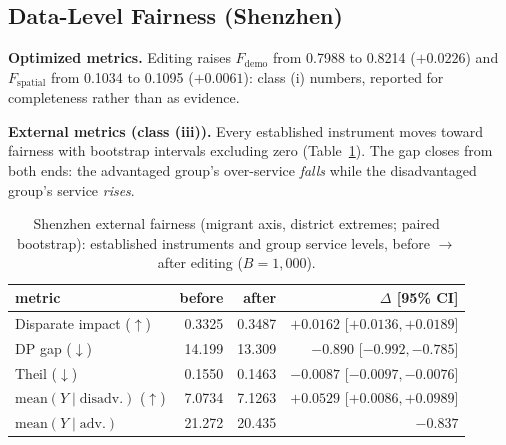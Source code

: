 \subsection{Data-Level Fairness (Shenzhen)}\label{sec:exp-data-level}

\textbf{Optimized metrics.} Editing raises $F_{\mathrm{demo}}$ from 0.7988
to 0.8214 ($+0.0226$) and $F_{\mathrm{spatial}}$ from 0.1034 to 0.1095
($+0.0061$): class (i) numbers, reported for completeness rather than as
evidence.

\textbf{External metrics (class (iii)).} Every established instrument moves
toward fairness with bootstrap intervals excluding zero
(Table~\ref{tab:external-sz}). The gap closes from both
ends: the advantaged group's over-service \emph{falls} while the disadvantaged
group's service \emph{rises}.

\begin{table}[t]
\centering
\caption{Shenzhen external fairness (migrant axis, district extremes; paired
bootstrap): established instruments and group service levels, before $\to$
after editing ($B{=}1{,}000$).}
\label{tab:external-sz}
\footnotesize
\setlength{\tabcolsep}{4pt}
\begin{tabular}{lrrr}
\toprule
metric & before & after & $\Delta$ [95\% CI] \\
\midrule
Disparate impact ($\uparrow$) & 0.3325 & 0.3487 & $+0.0162$ [$+0.0136, +0.0189$] \\
DP gap ($\downarrow$) & 14.199 & 13.309 & $-0.890$ [$-0.992, -0.785$] \\
Theil ($\downarrow$) & 0.1550 & 0.1463 & $-0.0087$ [$-0.0097, -0.0076$] \\
$\mathrm{mean}(Y \mid \mathrm{disadv.})$ ($\uparrow$) & 7.0734 & 7.1263 & $+0.0529$ [$+0.0086, +0.0989$] \\
$\mathrm{mean}(Y \mid \mathrm{adv.})$ & 21.272 & 20.435 & $-0.837$ \\
\bottomrule
\end{tabular}
\end{table}

